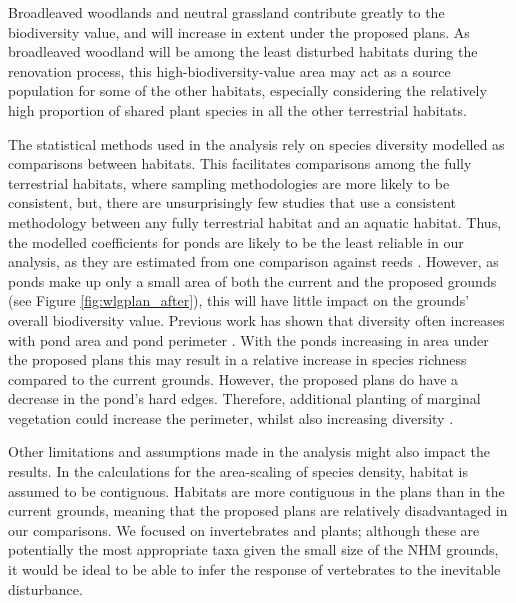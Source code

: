 Broadleaved woodlands and neutral grassland contribute greatly to the biodiversity value, and will increase in extent under the proposed plans. As broadleaved woodland will be among the least disturbed habitats during the renovation process, this high-biodiversity-value area may act as a source population for some of the other habitats, especially considering the relatively high proportion of shared plant species in all the other terrestrial habitats.

The statistical methods used in the analysis rely on species diversity modelled as comparisons between habitats. This facilitates comparisons among the fully terrestrial habitats, where sampling methodologies are more likely to be consistent, but, there are unsurprisingly few studies that use a consistent methodology between any fully terrestrial habitat and an aquatic habitat. Thus, the modelled coefficients for ponds are likely to be the least reliable in our analysis, as they are estimated from one comparison against reeds \citep{Williams:2008hb}. However, as ponds make up only a small area of both the current and the proposed grounds (see Figure \ref{fig:wlgplan_after}), this will have little impact on the grounds' overall biodiversity value. Previous work has shown that diversity often increases with pond area \citep{Oertli:2002bc,Parris:2006jae} and pond perimeter \citep{Gagne:2007le,Gagne:2010ec}. With the ponds increasing in area under the proposed plans this may result in a relative increase in species richness compared to the current grounds. However, the proposed plans do have a decrease in the pond's hard edges. Therefore, additional planting of marginal vegetation could increase the perimeter, whilst also increasing diversity \citep{Williams:2008hb,Gioria:2010bc}.


Other limitations and assumptions made in the analysis might also impact the results. In the calculations for the area-scaling of species density, habitat is assumed to be contiguous. Habitats are more contiguous in the plans than in the current grounds, meaning that the proposed plans are relatively disadvantaged in our comparisons. We focused on invertebrates and plants; although these are potentially the most appropriate taxa given the small size of the NHM grounds, it would be ideal to be able to infer the response of vertebrates to the inevitable disturbance.

